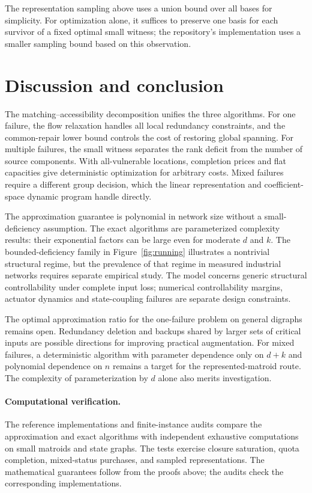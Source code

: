 \documentclass[11pt]{article}
\theoremstyle{definition}
\theoremstyle{remark}\newtheorem{remark}[theorem]{Remark}
\begin{document}
The representation sampling above uses a union bound over all
bases for simplicity. For optimization alone, it suffices
to preserve one basis for each survivor of a fixed optimal
small witness; the repository's implementation uses a
smaller sampling bound based on this observation.

\section{Discussion and conclusion}\label{sec:conclusion}
The matching--accessibility decomposition unifies the three
algorithms. For one failure, the flow relaxation handles all
local redundancy constraints, and the common-repair lower
bound controls the cost of restoring global spanning. For
multiple failures, the small witness separates the rank
deficit from the number of source components. With
all-vulnerable locations, completion prices and flat capacities
give deterministic optimization for arbitrary costs. Mixed
failures require a different group decision, which the linear
representation and coefficient-space dynamic program handle
directly.

The approximation guarantee is polynomial in network size
without a small-deficiency assumption. The exact algorithms
are parameterized complexity results: their exponential
factors can be large even for moderate $d$ and $k$. The
bounded-deficiency family in Figure~\ref{fig:running} illustrates
a nontrivial structural regime, but the prevalence of that
regime in measured industrial networks requires separate
empirical study. The model concerns generic structural
controllability under complete input loss; numerical
controllability margins, actuator dynamics and state-coupling
failures are separate design constraints.

The optimal approximation ratio for the one-failure problem
on general digraphs remains open. Redundancy deletion and
backups shared by larger sets of critical inputs are possible
directions for improving practical augmentation. For mixed
failures, a deterministic algorithm with parameter dependence
only on $d+k$ and polynomial dependence on $n$ remains a
target for the represented-matroid route. The complexity of
parameterization by $d$ alone also merits investigation.

\paragraph{Computational verification.}
The reference implementations and finite-instance audits
compare the approximation and exact algorithms with
independent exhaustive computations on small matroids and
state graphs. The tests exercise closure saturation, quota
completion, mixed-status purchases, and sampled representations.
The mathematical guarantees follow from the proofs above;
the audits check the corresponding implementations.
\end{document}
